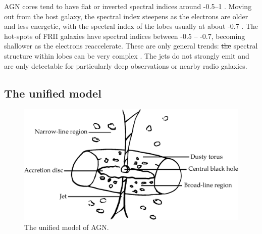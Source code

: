 \documentclass[11pt, a4paper]{book}
\providecommand{\DIFaddtex}[1]{{\protect\color{blue}\uwave{#1}}} %
\providecommand{\DIFdeltex}[1]{{\protect\color{red}\sout{#1}}}                      %
\providecommand{\DIFaddbegin}{} %
\providecommand{\DIFaddend}{} %
\providecommand{\DIFdelbegin}{} %
\providecommand{\DIFdelend}{} %
\providecommand{\DIFadd}[1]{\texorpdfstring{\DIFaddtex{#1}}{#1}} %
\providecommand{\DIFdel}[1]{\texorpdfstring{\DIFdeltex{#1}}{}} %
\newcommand{\DIFscaledelfig}{0.5}
\newlength{\DIFdelgraphicswidth} %
\newlength{\DIFdelgraphicsheight} %
\newcommand{\DIFaddincludegraphics}[2][]{{\color{blue}\fbox{\DIFOincludegraphics[#1]{#2}}}} %
\newcommand{\DIFdelincludegraphics}[2][]{%
\sbox{\DIFdelgraphicsbox}{\DIFOincludegraphics[#1]{#2}}%
\settoboxwidth{\DIFdelgraphicswidth}{\DIFdelgraphicsbox} %
\settoboxtotalheight{\DIFdelgraphicsheight}{\DIFdelgraphicsbox} %
\scalebox{\DIFscaledelfig}{%
\parbox[b]{\DIFdelgraphicswidth}{\usebox{\DIFdelgraphicsbox}\\[-\baselineskip] \rule{\DIFdelgraphicswidth}{0em}}\llap{\resizebox{\DIFdelgraphicswidth}{\DIFdelgraphicsheight}{%
\setlength{\unitlength}{\DIFdelgraphicswidth}%
\begin{picture}(1,1)%
\thicklines\linethickness{2pt} %
{\color[rgb]{1,0,0}\put(0,0){\framebox(1,1){}}}%
{\color[rgb]{1,0,0}\put(0,0){\line( 1,1){1}}}%
{\color[rgb]{1,0,0}\put(0,1){\line(1,-1){1}}}%
\end{picture}%
}\hspace*{3pt}}} %
} %
\DeclareRobustCommand{\DIFaddbegin}{\DIFOaddbegin \let\includegraphics\DIFaddincludegraphics} %
\DeclareRobustCommand{\DIFaddend}{\DIFOaddend \let\includegraphics\DIFOincludegraphics} %
\DeclareRobustCommand{\DIFdelbegin}{\DIFOdelbegin \let\includegraphics\DIFdelincludegraphics} %
\DeclareRobustCommand{\DIFdelend}{\DIFOaddend \let\includegraphics\DIFOincludegraphics} %
\begin{document}
        AGN cores tend to have flat or inverted spectral indices around -0.5--1 \citep{condon_essential_2016,randall_spectral_2012}. Moving out from the host galaxy, the spectral index steepens as the electrons are older and less energetic, with the spectral index of the lobes usually at about -0.7 \citep{condon_essential_2016}. The hot-spots of FRII galaxies have spectral indices between -0.5 -- -0.7, becoming shallower as the electrons reaccelerate. These are only general trends: \DIFdelbegin \DIFdel{the }\DIFdelend \DIFaddbegin \DIFadd{The }\DIFaddend spectral structure within lobes can be very complex \citep{treichel_spectral_2001}. The jets do not strongly emit and are only detectable for particularly deep observations or nearby radio galaxies.

    \subsection{The unified model}
    \label{sec:unified-model}

        \begin{figure}
            \centering
            \includegraphics[width=\textwidth]{images/agn.eps}
            \caption{\label{fig:agn} The unified model of AGN.}
        \end{figure}
\end{document}
